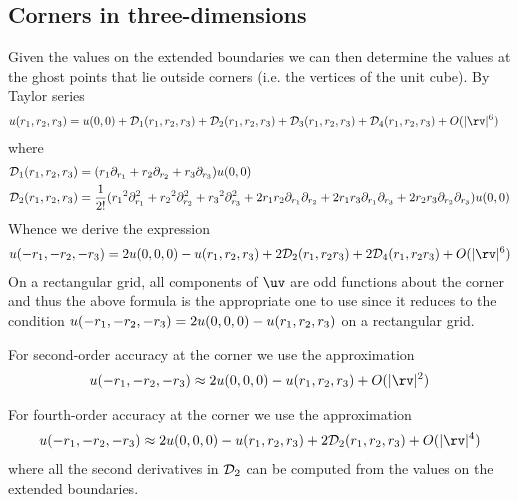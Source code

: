 
\clearpage
\subsection{Corners in three-dimensions}


Given the values on the extended boundaries we can then determine the 
values at the ghost points that lie outside corners (i.e. the vertices of the unit cube).
By Taylor series
\begin{align*}
  u(\ra,\rb,\rc)&= u(0,0) + \Ds_1(\ra,\rb,\rc) + \Ds_2(\ra,\rb,\rc) + \Ds_3(\ra,\rb,\rc) + \Ds_4(\ra,\rb,\rc) + \trunc
\end{align*}
where
\begin{align*}
  {\mathcal D}_1({r_1},{r_2},{r_3}) &= ({r_1} \partial_{r_1} + {r_2} \partial_{r_2} + {r_3} \partial_{r_3} ) u(0,0) \\
  {\mathcal D}_2({r_1},{r_2},{r_3}) &= {1\over2!}( {r_1}^2\partial_{r_1}^2+{r_2}^2\partial_{r_2}^2 +{r_3}^2\partial_{r_3}^2
                         + 2{r_1}{r_2}\partial_{r_1}\partial_{r_2} 
                         + 2{r_1}{r_3}\partial_{r_1}\partial_{r_3} + 2{r_2}{r_3}\partial_{r_2}\partial_{r_3} 
                     )u(0,0)  \\
\end{align*}
Whence we derive the expression
\begin{align}
 u(-\ra,-\rb,-\rc) &= 2 u(0,0,0) - u(\ra,\rb,\rc) + 2\Ds_2(\ra,\rb\rc) + 2\Ds_4(\ra,\rb\rc)+ \trunc \label{taylor1} \\
\end{align}
On a rectangular grid, all components of $\uv$ are odd functions about the corner and thus
the above formula is the appropriate one to use since it reduces to the condition
$u(-{r_1},-{r_2},-{r_3}) = 2 u(0,0,0) - u({r_1},{r_2},{r_3})$ on a rectangular grid.

For second-order accuracy at the corner we use the approximation
\begin{align}
   u(-\ra,-\rb,-\rc) &\approx 2 u(0,0,0) - u(\ra,\rb,\rc) + \trunca \\
\end{align}

For fourth-order accuracy  at the corner we use the approximation
\begin{align}
   u(-\ra,-\rb,-\rc) &\approx 2 u(0,0,0) - u(\ra,\rb,\rc) + 2\Ds_2(\ra,\rb,\rc) + \truncb \\
\end{align}
where all the second derivatives in ${\mathcal D}_2$ can be computed from the values on the extended boundaries.
